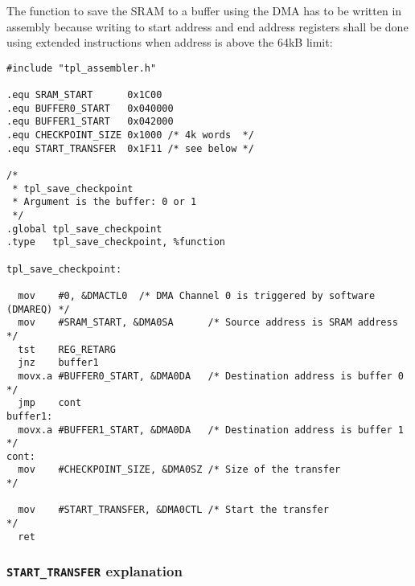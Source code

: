 \documentclass[11pt, oneside]{article}   	%
\begin{document}
The function to save the SRAM to a buffer using the DMA has to be written in assembly because writing to start address and end address registers shall be done using extended instructions when address is above the 64kB limit:

\begin{lstlisting}
#include "tpl_assembler.h"

.equ SRAM_START      0x1C00
.equ BUFFER0_START   0x040000
.equ BUFFER1_START   0x042000
.equ CHECKPOINT_SIZE 0x1000 /* 4k words  */
.equ START_TRANSFER  0x1F11 /* see below */

/*
 * tpl_save_checkpoint
 * Argument is the buffer: 0 or 1
 */
.global tpl_save_checkpoint
.type   tpl_save_checkpoint, %function

tpl_save_checkpoint:

  mov    #0, &DMACTL0  /* DMA Channel 0 is triggered by software (DMAREQ) */
  mov    #SRAM_START, &DMA0SA      /* Source address is SRAM address      */
  tst    REG_RETARG
  jnz    buffer1
  movx.a #BUFFER0_START, &DMA0DA   /* Destination address is buffer 0     */
  jmp    cont
buffer1:
  movx.a #BUFFER1_START, &DMA0DA   /* Destination address is buffer 1     */
cont:
  mov    #CHECKPOINT_SIZE, &DMA0SZ /* Size of the transfer                */
  
  mov    #START_TRANSFER, &DMA0CTL /* Start the transfer                  */
  ret
\end{lstlisting}

\subsubsection*{\lstinline{START_TRANSFER} explanation}
\end{document}
